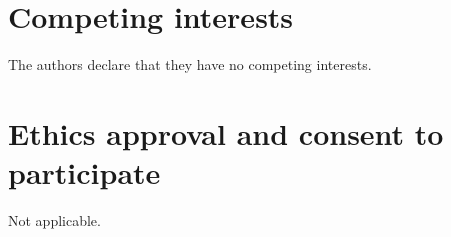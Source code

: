 \documentclass[twocolumn]{bmcart}%
\begin{document}
\begin{backmatter}
\section*{Competing interests}
The authors declare that they have no competing interests.

\section*{Ethics approval and consent to participate}%
Not applicable. 





\end{backmatter}
\end{document}
